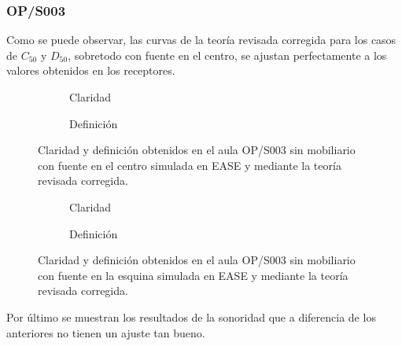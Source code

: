 \subsubsection{OP/S003}

Como se puede observar, las curvas de la teoría revisada corregida para los casos de $C_{50}$ y $D_{50}$, sobretodo con fuente en el centro, se ajustan perfectamente a los valores obtenidos en los receptores.
\begin{figure}[H]
    \begin{subfigure}[b]{0.4\textwidth}
    	\centering%
         {%
    }
    \caption{Claridad}%
    \end{subfigure}%
    \hspace{1.9cm}%
    \begin{subfigure}[b]{0.4\textwidth}%
    	\centering%
        {%
    }
    \caption{Definición}%
    \end{subfigure}
    \caption{Claridad y definición obtenidos en el aula OP/S003 sin mobiliario con fuente en el centro simulada en EASE y mediante la teoría revisada corregida.}
\label{graf:claridaddefinicionopcentro}%
\end{figure}

\begin{figure}[H]
    \begin{subfigure}[b]{0.4\textwidth}
    	\centering%
         {%
    }
    \caption{Claridad}%
    \end{subfigure}%
    \hspace{1.9cm}%
    \begin{subfigure}[b]{0.4\textwidth}%
    	\centering%
        {%
    }
    \caption{Definición}%
    \end{subfigure}
    \caption{Claridad y definición obtenidos en el aula OP/S003 sin mobiliario con fuente en la esquina simulada en EASE y mediante la teoría revisada corregida.}
\label{graf:claridaddefinicionopesquina}%
\end{figure}

Por último se muestran los resultados de la sonoridad que a diferencia de los anteriores no tienen un ajuste tan bueno.

